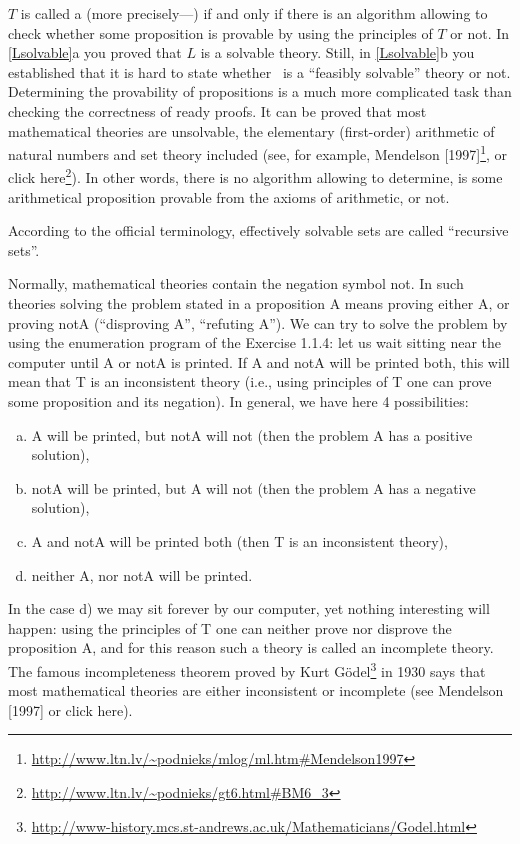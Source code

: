 \(T\) is called a  (more precisely---) if and only if there is an algorithm allowing to check whether some proposition is provable by using the principles of \(T\) or not.
In \cref{Lsolvable}a you proved that \(L\) is a solvable theory.
Still, in \cref{Lsolvable}b you established that it is hard to state whether \CHESS\ is a ``feasibly solvable'' theory or not.
Determining the provability of propositions is a much more complicated task than checking the correctness of ready proofs.
It can be proved that most mathematical theories are unsolvable, the elementary (first-order) arithmetic of natural numbers and set theory included (see, for example, Mendelson [1997]\footnote{\url{http://www.ltn.lv/~podnieks/mlog/ml.htm\#Mendelson1997}}, or click here\footnote{\url{http://www.ltn.lv/~podnieks/gt6.html\#BM6\_3}}).
In other words, there is no algorithm allowing to determine, is some arithmetical proposition provable from the axioms of arithmetic, or not.

\begin{note}
According to the official terminology, effectively solvable sets are called ``recursive sets''.
\end{note}

Normally, mathematical theories contain the negation symbol not. In such theories solving the problem stated in a proposition A means proving either A, or proving notA (``disproving A'', ``refuting A''). We can try to solve the problem by using the enumeration program of the Exercise 1.1.4: let us wait sitting near the computer until A or notA is printed. If A and notA will be printed both, this will mean that T is an inconsistent theory (i.e., using principles of T one can prove some proposition and its negation). In general, we have here 4 possibilities:

\begin{enumerate}[(a)]
    \item A will be printed, but notA will not (then the problem A has a positive solution),
    \item notA will be printed, but A will not (then the problem A has a negative solution),
    \item A and notA will be printed both (then T is an inconsistent theory),
    \item neither A, nor notA will be printed.
\end{enumerate}

In the case d) we may sit forever by our computer, yet nothing interesting will happen: using the principles of T one can neither prove nor disprove the proposition A, and for this reason such a theory is called an incomplete theory. The famous incompleteness theorem proved by Kurt G\"{o}del\footnote{\url{http://www-history.mcs.st-andrews.ac.uk/Mathematicians/Godel.html}} in 1930 says that most mathematical theories are either inconsistent or incomplete (see Mendelson [1997] or click here).

